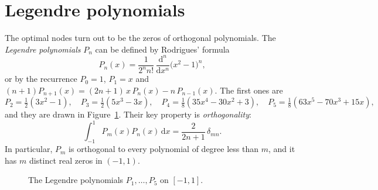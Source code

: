 \documentclass[11pt,a4paper,twoside,openright]{book}
\newcommand{\dd}{\,\mathrm{d}}
\begin{document}
\section{Legendre polynomials}
The optimal nodes turn out to be the zeros of orthogonal polynomials.
The \emph{Legendre polynomials} $P_n$ can be defined by Rodrigues' formula
\[
  P_n(x)=\frac{1}{2^{n}n!}\,\frac{\mathrm d^{n}}{\mathrm dx^{n}}\bigl(x^{2}-1\bigr)^{n},
\]
or by the recurrence $P_0=1$, $P_1=x$ and $(n+1)P_{n+1}(x)=(2n+1)\,x\,P_n(x)-n\,P_{n-1}(x)$.
The first ones are
\[
  P_2=\tfrac12(3x^{2}-1),\quad P_3=\tfrac12(5x^{3}-3x),\quad P_4=\tfrac18(35x^{4}-30x^{2}+3),\quad P_5=\tfrac18(63x^{5}-70x^{3}+15x),
\]
and they are drawn in Figure~\ref{fig:legendre}.
Their key property is \emph{orthogonality}:
\begin{equation}
  \int_{-1}^{1}P_m(x)P_n(x)\dd x=\frac{2}{2n+1}\,\delta_{mn}.
  \label{eq:orthogonality}
\end{equation}
In particular, $P_m$ is orthogonal to every polynomial of degree less than $m$, and it has $m$ distinct real zeros in $(-1,1)$.

\begin{figure}[htbp]
  \centering
  \caption{The Legendre polynomials $P_1,\dots,P_5$ on $[-1,1]$.}
  \label{fig:legendre}
\end{figure}
\end{document}
